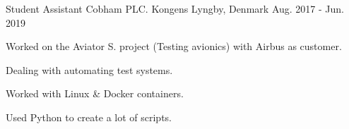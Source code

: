 \begin{cventries}
  \cventry
    {Student Assistant} %
    {Cobham PLC.} %
    {Kongens Lyngby, Denmark} %
    {Aug. 2017 - Jun. 2019} %
    {
      \begin{cvitems} %
        \item {Worked on the Aviator S. project (Testing avionics) with Airbus as customer.}
        \item {Dealing with automating test systems.}
        \item {Worked with Linux \& Docker containers.}
        \item {Used Python to create a lot of scripts.}
      \end{cvitems}
    }

\end{cventries}

